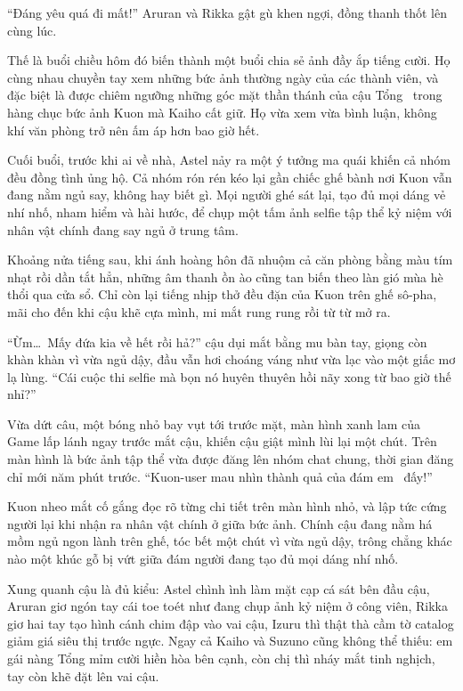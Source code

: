 \documentclass[../main.tex]{subfiles}
\begin{document}
``Đáng yêu quá đi mất!'' Aruran và Rikka gật gù khen ngợi, đồng thanh thốt lên cùng lúc.

Thế là buổi chiều hôm đó biến thành một buổi chia sẻ ảnh đầy ắp tiếng cười. Họ cùng nhau chuyền tay xem những bức ảnh thường ngày của các thành viên, và đặc biệt là được chiêm ngưỡng những góc mặt thần thánh của cậu Tổng \hll\ trong hàng chục bức ảnh Kuon mà Kaiho cất giữ. Họ vừa xem vừa bình luận, không khí văn phòng trở nên ấm áp hơn bao giờ hết.

Cuối buổi, trước khi ai về nhà, Astel nảy ra một ý tưởng ma quái khiến cả nhóm đều đồng tình ủng hộ. Cả nhóm rón rén kéo lại gần chiếc ghế bành nơi Kuon vẫn đang nằm ngủ say, không hay biết gì. Mọi người ghé sát lại, tạo đủ mọi dáng vẻ nhí nhố, nham hiểm và hài hước, để chụp một tấm ảnh selfie tập thể kỷ niệm với nhân vật chính đang say ngủ ở trung tâm.

\ct

Khoảng nửa tiếng sau, khi ánh hoàng hôn đã nhuộm cả căn phòng bằng màu tím nhạt rồi dần tắt hẳn, những âm thanh ồn ào cũng tan biến theo làn gió mùa hè thổi qua cửa sổ. Chỉ còn lại tiếng nhịp thở đều đặn của Kuon trên ghế sô-pha, mãi cho đến khi cậu khẽ cựa mình, mi mắt rung rung rồi từ từ mở ra.

``Ừm\dots\ Mấy đứa kia về hết rồi hả?'' cậu dụi mắt bằng mu bàn tay, giọng còn khàn khàn vì vừa ngủ dậy, đầu vẫn hơi choáng váng như vừa lạc vào một giấc mơ lạ lùng. ``Cái cuộc thi selfie mà bọn nó huyên thuyên hồi nãy xong từ bao giờ thế nhỉ?''

Vừa dứt câu, một bóng nhỏ bay vụt tới trước mặt, màn hình xanh lam của Game lấp lánh ngay trước mắt cậu, khiến cậu giật mình lùi lại một chút. Trên màn hình là bức ảnh tập thể vừa được đăng lên nhóm chat chung, thời gian đăng chỉ mới năm phút trước. ``Kuon-user mau nhìn thành quả của đám em \hls\ đấy!''

Kuon nheo mắt cố gắng đọc rõ từng chi tiết trên màn hình nhỏ, và lập tức cứng người lại khi nhận ra nhân vật chính ở giữa bức ảnh. Chính cậu đang nằm há mồm ngủ ngon lành trên ghế, tóc bết một chút vì vừa ngủ dậy, trông chẳng khác nào một khúc gỗ bị vứt giữa đám người đang tạo đủ mọi dáng nhí nhố.

Xung quanh cậu là đủ kiểu: Astel chình ình làm mặt cạp cá sát bên đầu cậu, Aruran giơ ngón tay cái toe toét như đang chụp ảnh kỷ niệm ở công viên, Rikka giơ hai tay tạo hình cánh chim đập vào vai cậu, Izuru thì thật thà cầm tờ catalog giảm giá siêu thị trước ngực. Ngay cả Kaiho và Suzuno cũng không thể thiếu: em gái nàng Tổng mỉm cười hiền hòa bên cạnh, còn chị thì nháy mắt tinh nghịch, tay còn khẽ đặt lên vai cậu.
\end{document}
